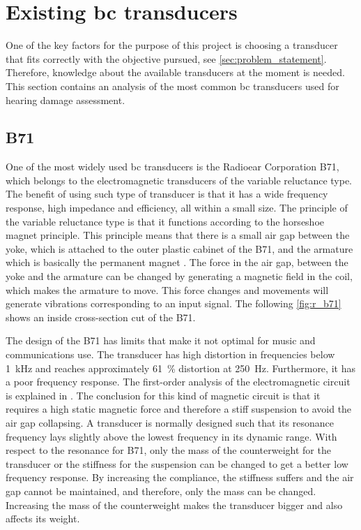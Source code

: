 \section{Existing \gls{bc} transducers}
One of the key factors for the purpose of this project is choosing a transducer that fits correctly with the objective pursued, see \autoref{sec:problem_statement}. Therefore, knowledge about the available transducers at the moment is needed. %
This section contains an analysis of the most common \gls{bc} transducers used for hearing damage assessment. %

\subsection{B71}
One of the most widely used \gls{bc} transducers is the Radioear Corporation B71, which belongs to the electromagnetic transducers of the variable reluctance type. The benefit of using such type of transducer is that it has a wide frequency response, high impedance and efficiency, all within a small size. The principle of the variable reluctance type is that it functions according to the horseshoe magnet principle. This principle means that there is a small air gap between the yoke, which is attached to the outer plastic cabinet of the B71, and the armature which is basically the permanent magnet \citep{the_balanced_2003}. The force in the air gap, between the yoke and the armature can be changed by generating a magnetic field in the coil, which makes the armature to move. This force changes and movements will generate vibrations corresponding to an input signal. The following \autoref{fig:r_b71} shows an inside cross-section cut of the B71.



The design of the B71 has limits that make it not optimal for music and communications use. The transducer has high distortion in frequencies below \SI{1}{\kilo\hertz} and reaches approximately \SI{61}{\percent} distortion at \SI{250}{\hertz}. Furthermore, it has a poor frequency response. The first-order analysis of the electromagnetic circuit is explained in \citep{the_balanced_2003}. The conclusion for this kind of magnetic circuit is that it requires a high static magnetic force and therefore a stiff suspension to avoid the air gap collapsing. A transducer is normally designed such that its resonance frequency lays slightly above the lowest frequency in its dynamic range. With respect to the resonance for B71, only the mass of the counterweight for the transducer or the stiffness for the suspension can be changed to get a better low frequency response. By increasing the compliance, the stiffness suffers and the air gap cannot be maintained, and therefore, only the mass can be changed. Increasing the mass of the counterweight makes the transducer bigger and also affects its weight. 

